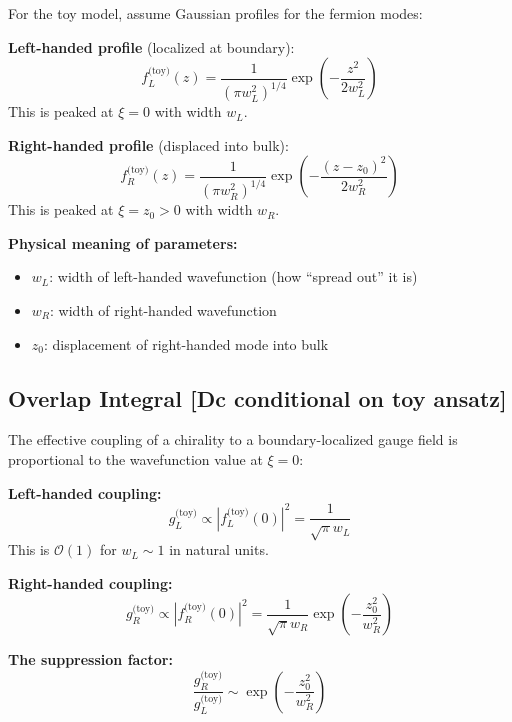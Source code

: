 For the toy model, assume Gaussian profiles for the fermion modes:

\textbf{Left-handed profile} (localized at boundary):
\begin{equation}
    f_L^{\text{(toy)}}(z) = \frac{1}{(\pi w_L^2)^{1/4}} \exp\left(-\frac{z^2}{2w_L^2}\right)
    \label{eq:ch9_toy_fL}
\end{equation}
This is peaked at $\xi = 0$ with width $w_L$.

\textbf{Right-handed profile} (displaced into bulk):
\begin{equation}
    f_R^{\text{(toy)}}(z) = \frac{1}{(\pi w_R^2)^{1/4}} \exp\left(-\frac{(z - z_0)^2}{2w_R^2}\right)
    \label{eq:ch9_toy_fR}
\end{equation}
This is peaked at $\xi = z_0 > 0$ with width $w_R$.

\textbf{Physical meaning of parameters:}
\begin{itemize}[nosep]
    \item $w_L$: width of left-handed wavefunction (how ``spread out'' it is)
    \item $w_R$: width of right-handed wavefunction
    \item $z_0$: displacement of right-handed mode into bulk
\end{itemize}

\subsection{Overlap Integral [Dc conditional on toy ansatz]}

The effective coupling of a chirality to a boundary-localized gauge field is
proportional to the wavefunction value at $\xi = 0$:

\textbf{Left-handed coupling:}
\begin{equation}
    g_L^{\text{(toy)}} \propto |f_L^{\text{(toy)}}(0)|^2 = \frac{1}{\sqrt{\pi} w_L}
    \label{eq:ch9_toy_gL}
\end{equation}
This is $\mathcal{O}(1)$ for $w_L \sim 1$ in natural units.

\textbf{Right-handed coupling:}
\begin{equation}
    g_R^{\text{(toy)}} \propto |f_R^{\text{(toy)}}(0)|^2
    = \frac{1}{\sqrt{\pi} w_R} \exp\left(-\frac{z_0^2}{w_R^2}\right)
    \label{eq:ch9_toy_gR}
\end{equation}

\textbf{The suppression factor:}
\begin{equation}
    \frac{g_R^{\text{(toy)}}}{g_L^{\text{(toy)}}} \sim \exp\left(-\frac{z_0^2}{w_R^2}\right)
    \label{eq:ch9_toy_suppression}
\end{equation}

